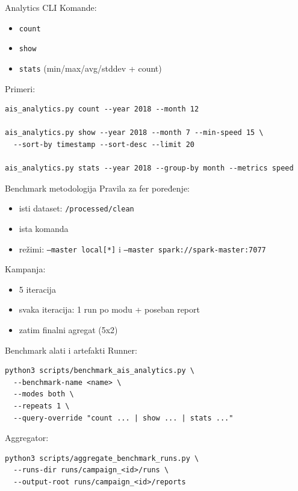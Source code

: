 \documentclass[aspectratio=169,11pt]{beamer}
\newcommand{\code}[1]{\texttt{\small #1}}
\begin{document}
\begin{frame}[fragile]{Analytics CLI}
  Komande:
  \begin{itemize}
    \item \code{count}
    \item \code{show}
    \item \code{stats} (min/max/avg/stddev + count)
  \end{itemize}

  Primeri:
  \begin{verbatim}
ais_analytics.py count --year 2018 --month 12

ais_analytics.py show --year 2018 --month 7 --min-speed 15 \
  --sort-by timestamp --sort-desc --limit 20

ais_analytics.py stats --year 2018 --group-by month --metrics speed
  \end{verbatim}
\end{frame}

\begin{frame}{Benchmark metodologija}
  Pravila za fer poređenje:
  \begin{itemize}
    \item isti dataset: \code{/processed/clean}
    \item ista komanda
    \item režimi: \code{--master local[*]} i \code{--master spark://spark-master:7077}
  \end{itemize}

  \vspace{0.35cm}
  Kampanja:
  \begin{itemize}
    \item 5 iteracija
    \item svaka iteracija: 1 run po modu + poseban report
    \item zatim finalni agregat (5x2)
  \end{itemize}
\end{frame}

\begin{frame}[fragile]{Benchmark alati i artefakti}
  Runner:
  \begin{verbatim}
python3 scripts/benchmark_ais_analytics.py \
  --benchmark-name <name> \
  --modes both \
  --repeats 1 \
  --query-override "count ... | show ... | stats ..."
  \end{verbatim}

  Aggregator:
  \begin{verbatim}
python3 scripts/aggregate_benchmark_runs.py \
  --runs-dir runs/campaign_<id>/runs \
  --output-root runs/campaign_<id>/reports
  \end{verbatim}
\end{frame}
\end{document}

